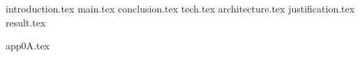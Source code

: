 \documentclass[a4paper,12pt,oneside,openbib,oldfontcommands]{memoir} %
\newcommand{\clearemptydoublepage}{\newpage{\thispagestyle{empty}\cleardoublepage}}
\theoremstyle{plain}
\theoremstyle{plain}
\theoremstyle{plain}
\theoremstyle{definition}
\theoremstyle{plain}
\theoremstyle{plain}
\theoremstyle{plain}
\begin{document}
% 
%
% 
\frontmatter
{}
%

%

\clearemptydoublepage
%

%





%
%
\listoftables
{}
\newpage
%
%
\listoffigures
{}
\newpage
%
%
\renewcommand{\contentsname}{Table of Contents}
\tableofcontents*


 
% 




\mainmatter
%
{introduction.tex}
%
{main.tex}
%
{conclusion.tex}
%
{tech.tex}
{architecture.tex}
{justification.tex}
{result.tex}

\backmatter              %


%
\backmatter

\nocite{*}


\appendix
{app0A.tex}


\clearemptydoublepage
%
%   
\end{document}
